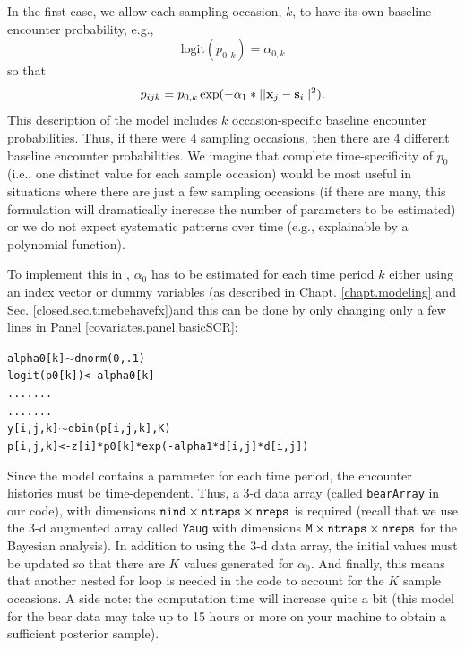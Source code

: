 In the first case, we allow each sampling occasion, $k$, to have its
own baseline encounter probability, e.g.,
\[
\mbox{logit}(p_{0,k}) = \alpha_{0,k}
\]
so that
\[
p_{ijk} = p_{0,k} \exp(- \alpha_1*||{\bf x}_{j}-{\bf s}_{i}||^2).
\]
This description of the model includes $k$ occasion-specific baseline
encounter probabilities.  Thus, if there were 4 sampling occasions, then
there are 4 different baseline encounter probabilities.  We imagine
that complete time-specificity of $p_{0}$ 
(i.e., one distinct value for each sample occasion)
would be most useful in situations
where there are just a few sampling occasions (if there are many, this
formulation will dramatically increase the number of parameters to be
estimated) or we do not expect systematic patterns over time (e.g.,
explainable by a polynomial function).

To implement this in \jags, $\alpha_0$ has to be
estimated for each time period $k$ either using an index vector or
dummy variables (as described in Chapt. \ref{chapt.modeling} and Sec. 
\ref{closed.sec.timebehavefx})and this can be done by only 
changing only a few lines in Panel \ref{covariates.panel.basicSCR}:
\begin{alltt}
alpha0[k] \(\sim\) dnorm(0,.1)
logit(p0[k]) <- alpha0[k]
.......
.......
y[i,j,k] \(\sim\) dbin(p[i,j,k],K)
p[i,j,k] <- z[i]*p0[k]*exp(- alpha1*d[i,j]*d[i,j])
\end{alltt}

Since the model contains a parameter for each time period, the
encounter histories must be time-dependent.  Thus, a 3-d data array
(called \mbox{\tt bearArray} in our code), with dimensions $\mbox{\tt
  nind} \times \mbox{\tt ntraps} \times \mbox{\tt nreps}$ is
required (recall that we use the 3-d augmented array called {\tt Yaug}
with dimensions $\mbox{\tt M} \times \mbox{\tt ntraps} \times \mbox{\tt nreps}$
for the Bayesian analysis). In addition to using the 3-d data array, the initial values
must be updated so that there are $K$ values generated for $\alpha_0$.
And finally, this means that another nested for loop is needed
in the code to account for the $K$ sample occasions.  A side note: the
computation time will increase quite a bit (this model for the bear
data may take up to 15 hours or more on your machine to obtain a
sufficient posterior sample).

